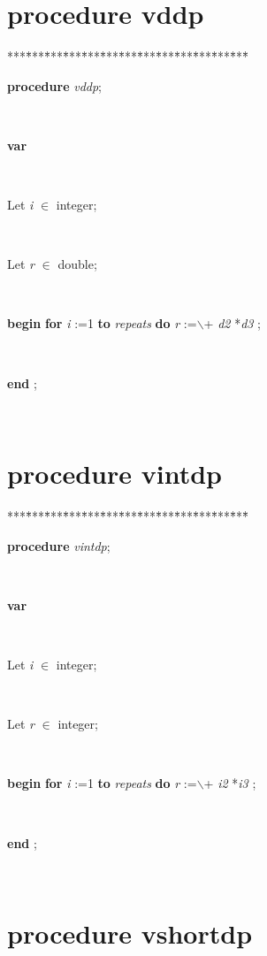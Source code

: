 \documentclass[10pt, a4paper]{article}
\begin{document}
\section{procedure vddp}\label{sec:vectest/dovectestvddp}

\begin{tabbing}
***\=***\=***\=***\=***\=***\=***\=***\=***\=***\=***\=***\=***\=\kill
\parbox{14cm}{\textsf {\textbf {procedure } \textsf{\textit{vddp}}; }}\\
\+\parbox{14cm}{\textsf{\textbf{var} }}\\
\parbox{14cm}{\textsf{Let \textit{i} $\in$ integer;}}\\
\parbox{14cm}{\textsf{Let \textit{r} $\in$ double;}}\\
\-\<\+\parbox{14cm}{\textsf{\textbf{begin}      \textbf{for}  \textit{i} :=1 \textbf{to}  \textit{repeats}  \textbf{do}  \textit{r} :=$ \backslash $+ \textit{d2} *\textit{d3} ;}}\\
\<\-\parbox{14cm}{\textsf{\textbf{end} ;}}\\
\end{tabbing}
\section{procedure vintdp}\label{sec:vectest/dovectestvintdp}

\begin{tabbing}
***\=***\=***\=***\=***\=***\=***\=***\=***\=***\=***\=***\=***\=\kill
\parbox{14cm}{\textsf {\textbf {procedure } \textsf{\textit{vintdp}}; }}\\
\+\parbox{14cm}{\textsf{\textbf{var} }}\\
\parbox{14cm}{\textsf{Let \textit{i} $\in$ integer;}}\\
\parbox{14cm}{\textsf{Let \textit{r} $\in$ integer;}}\\
\-\<\+\parbox{14cm}{\textsf{\textbf{begin}      \textbf{for}  \textit{i} :=1 \textbf{to}  \textit{repeats}  \textbf{do}  \textit{r} :=$ \backslash $+ \textit{i2} *\textit{i3} ;}}\\
\<\-\parbox{14cm}{\textsf{\textbf{end} ;}}\\
\end{tabbing}
\section{procedure vshortdp}\label{sec:vectest/dovectestvshortdp}
\end{document}
